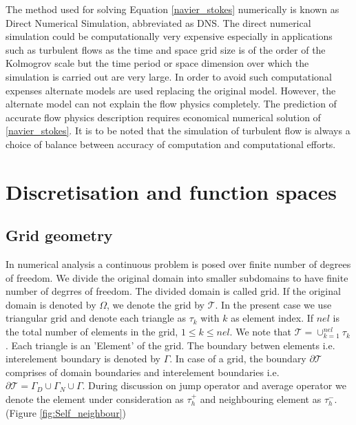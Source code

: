 \documentclass[a4paper]{book}
\begin{document}
The method used for solving Equation \eqref{navier_stokes} numerically is known as Direct Numerical Simulation, abbreviated as DNS. The direct numerical simulation could be computationally very expensive especially in applications such as turbulent flows as the time and space grid size is of the order of the Kolmogrov scale but the time period or space dimension over which the simulation is carried out are very large. In order to avoid such computational expenses alternate models are used replacing the original model. However, the alternate model can not explain the flow physics completely. The prediction of accurate flow physics description requires economical numerical solution of \eqref{navier_stokes}. It is to be noted that the simulation of turbulent flow is always a choice of balance between accuracy of computation and computational efforts.

\chapter{Discretisation and function spaces}

\section{Grid geometry}

In numerical analysis a continuous problem is posed over finite number of degrees of freedom. We divide the original domain into smaller subdomains to have finite number of degrres of freedom. The divided domain is called grid. If the original domain is denoted by $\Omega$, we denote the grid by $\mathcal{T}$. In the present case we use triangular grid and denote each triangle as $\tau_k$ with $k$ as element index. If $nel$ is the total number of elements in the grid, $1\leq k \leq nel$. We note that $\mathcal{T} = \cup_{k=1}^{nel} \tau_k$. Each triangle is an 'Element' of the grid. The boundary betwen elements i.e. interelement boundary is denoted by $\Gamma$. In case of a grid, the boundary $\partial \mathcal{T}$ comprises of domain boundaries and interelement boundaries i.e. $\partial \mathcal{T} = \Gamma_D \cup \Gamma_N \cup \Gamma$. During discussion on jump operator and average operator we denote the element under consideration as $\tau_{h}^+$ and neighbouring element as $\tau_{h}^-$. (Figure \ref{fig:Self_neighbour})
\end{document}

